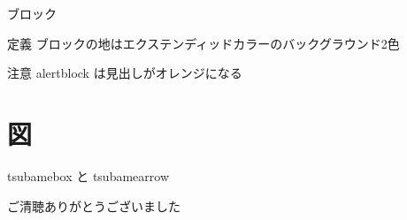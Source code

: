 \documentclass{beamer}
\begin{document}
\begin{frame}{ブロック}
    \begin{block}{定義}
        ブロックの地はエクステンディッドカラーのバックグラウンド2色
    \end{block}
    \begin{alertblock}{注意}
        alertblock は見出しがオレンジになる
    \end{alertblock}
\end{frame}

\section{図}

\begin{frame}{tsubamebox と tsubamearrow}
    \begin{center}
    \end{center}
\end{frame}

\begin{frame}[standout]
    ご清聴ありがとうございました
\end{frame}
\end{document}

